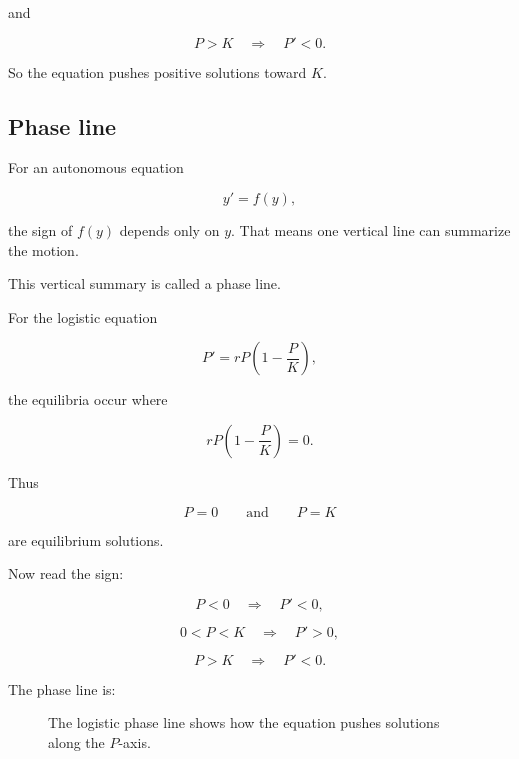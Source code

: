 and

\[
P>K
\quad\Longrightarrow\quad
P'<0.
\]

So the equation pushes positive solutions toward \(K\).

\subsection{Phase line}
\label{subsec:phase-line}

For an autonomous equation

\[
y'=f(y),
\]

the sign of \(f(y)\) depends only on \(y\).  That means one vertical line can summarize
the motion.

This vertical summary is called a phase line.

For the logistic equation

\[
P'=rP\left(1-\frac{P}{K}\right),
\]

the equilibria occur where

\[
rP\left(1-\frac{P}{K}\right)=0.
\]

Thus

\[
P=0
\qquad\text{and}\qquad
P=K
\]

are equilibrium solutions.

Now read the sign:

\[
P<0
\quad\Longrightarrow\quad
P'<0,
\]

\[
0<P<K
\quad\Longrightarrow\quad
P'>0,
\]

\[
P>K
\quad\Longrightarrow\quad
P'<0.
\]

The phase line is:

\begin{figure}[h]
\centering
{}
\caption{The logistic phase line shows how the equation pushes solutions along the \(P\)-axis.}
\label{fig:logistic-phase-line-ch13}
\end{figure}

